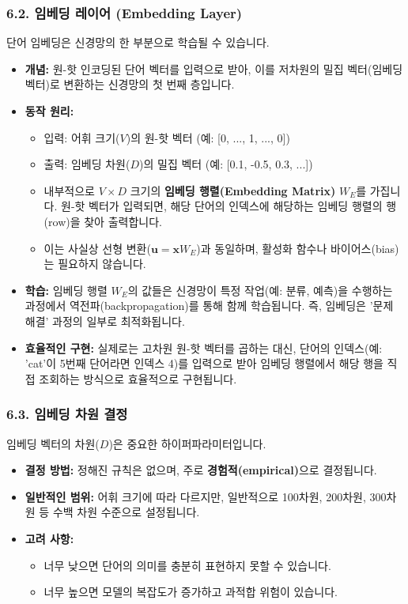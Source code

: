 \documentclass[11pt,a4paper]{article}
\theoremstyle{definition}
\begin{document}
\subsubsection{6.2. 임베딩 레이어 (Embedding Layer)}
단어 임베딩은 신경망의 한 부분으로 학습될 수 있습니다.

\begin{itemize}
    \item \textbf{개념:} 원-핫 인코딩된 단어 벡터를 입력으로 받아, 이를 저차원의 밀집 벡터(임베딩 벡터)로 변환하는 신경망의 첫 번째 층입니다.
    \item \textbf{동작 원리:}
    \begin{itemize}
        \item 입력: 어휘 크기($V$)의 원-핫 벡터 (예: [0, ..., 1, ..., 0])
        \item 출력: 임베딩 차원($D$)의 밀집 벡터 (예: [0.1, -0.5, 0.3, ...])
        \item 내부적으로 $V \times D$ 크기의 \textbf{임베딩 행렬(Embedding Matrix)} $W_E$를 가집니다. 원-핫 벡터가 입력되면, 해당 단어의 인덱스에 해당하는 임베딩 행렬의 행(row)을 찾아 출력합니다.
        \item 이는 사실상 선형 변환($\mathbf{u} = \mathbf{x} W_E$)과 동일하며, 활성화 함수나 바이어스(bias)는 필요하지 않습니다.
    \end{itemize}
    \item \textbf{학습:} 임베딩 행렬 $W_E$의 값들은 신경망이 특정 작업(예: 분류, 예측)을 수행하는 과정에서 역전파(backpropagation)를 통해 함께 학습됩니다. 즉, 임베딩은 '문제 해결' 과정의 일부로 최적화됩니다.
    \item \textbf{효율적인 구현:} 실제로는 고차원 원-핫 벡터를 곱하는 대신, 단어의 인덱스(예: 'cat'이 5번째 단어라면 인덱스 4)를 입력으로 받아 임베딩 행렬에서 해당 행을 직접 조회하는 방식으로 효율적으로 구현됩니다.
\end{itemize}

\subsubsection{6.3. 임베딩 차원 결정}
임베딩 벡터의 차원($D$)은 중요한 하이퍼파라미터입니다.

\begin{itemize}
    \item \textbf{결정 방법:} 정해진 규칙은 없으며, 주로 \textbf{경험적(empirical)}으로 결정됩니다.
    \item \textbf{일반적인 범위:} 어휘 크기에 따라 다르지만, 일반적으로 100차원, 200차원, 300차원 등 수백 차원 수준으로 설정됩니다.
    \item \textbf{고려 사항:}
    \begin{itemize}
        \item 너무 낮으면 단어의 의미를 충분히 표현하지 못할 수 있습니다.
        \item 너무 높으면 모델의 복잡도가 증가하고 과적합 위험이 있습니다.
    \end{itemize}
\end{itemize}
\end{document}
